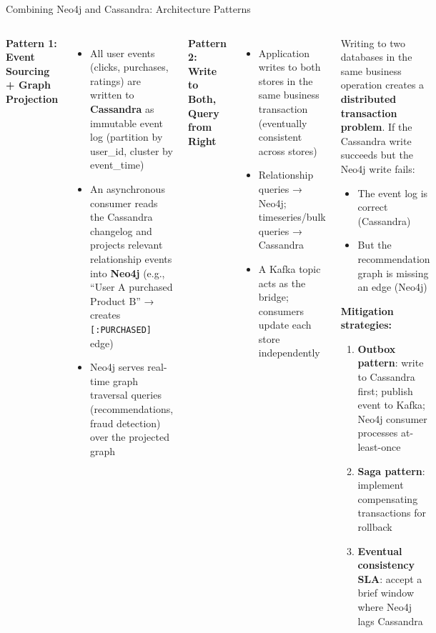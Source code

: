 \documentclass[aspectratio=169]{beamer}
\begin{document}
\begin{frame}{Combining Neo4j and Cassandra: Architecture Patterns}
  \begin{columns}[T]
      \small
      \textbf{Pattern 1: Event Sourcing + Graph Projection}
      \begin{itemize}\scriptsize
        \item All user events (clicks, purchases, ratings) are written to \textbf{Cassandra} as immutable event log (partition by user\_id, cluster by event\_time)
        \item An asynchronous consumer reads the Cassandra changelog and projects relevant relationship events into \textbf{Neo4j} (e.g., ``User A purchased Product B'' → creates \texttt{[:PURCHASED]} edge)
        \item Neo4j serves real-time graph traversal queries (recommendations, fraud detection) over the projected graph
      \end{itemize}
      \vspace{0.2cm}
      \textbf{Pattern 2: Write to Both, Query from Right}
      \begin{itemize}\scriptsize
        \item Application writes to both stores in the same business transaction (eventually consistent across stores)
        \item Relationship queries → Neo4j; timeseries/bulk queries → Cassandra
        \item A Kafka topic acts as the bridge; consumers update each store independently
      \end{itemize}
      \begin{tcolorbox}[deepdivebox, title={Deep Dive: Data Consistency Risk}]
        \scriptsize
        Writing to two databases in the same business operation creates a \textbf{distributed transaction problem}. If the Cassandra write succeeds but the Neo4j write fails:
        \begin{itemize}
          \item The event log is correct (Cassandra)
          \item But the recommendation graph is missing an edge (Neo4j)
        \end{itemize}
        \textbf{Mitigation strategies:}
        \begin{enumerate}
          \item \textbf{Outbox pattern}: write to Cassandra first; publish event to Kafka; Neo4j consumer processes at-least-once
          \item \textbf{Saga pattern}: implement compensating transactions for rollback
          \item \textbf{Eventual consistency SLA}: accept a brief window where Neo4j lags Cassandra
        \end{enumerate}
      \end{tcolorbox}
  \end{columns}
\end{frame}
\end{document}
